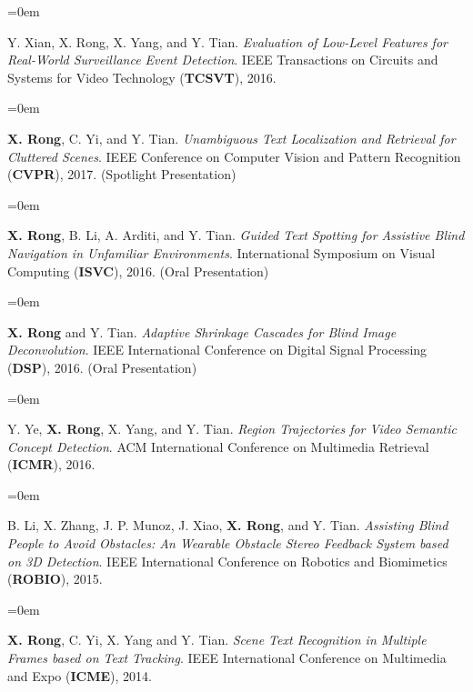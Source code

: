 \documentclass{scrartcl}
\newcommand{\Description}[1]{\hangindent=0em\hangafter=0\noindent\raggedright\footnotesize{#1}\par\normalsize\vspace{1em}} %
\begin{document}
\begin{cv}{}
\vspace{0.5em} %


\noindent{}\vspace{0.5em}

\Description{Y. Xian, X. Rong, X. Yang, and Y. Tian. \textit{Evaluation of Low-Level Features for Real-World Surveillance Event Detection}. IEEE Transactions on Circuits and Systems for Video Technology (\textbf{TCSVT}), 2016.}

\vspace{0.5em} %

\noindent{}\vspace{0.5em}

\Description{\textbf{X. Rong}, C. Yi, and Y. Tian. \textit{Unambiguous Text Localization and Retrieval for Cluttered Scenes}. IEEE Conference on Computer Vision and Pattern Recognition (\textbf{CVPR}), 2017. (Spotlight Presentation)}

\Description{\textbf{X. Rong}, B. Li, A. Arditi, and Y. Tian. \textit{Guided Text Spotting for Assistive Blind Navigation in Unfamiliar Environments}. International Symposium on Visual Computing (\textbf{ISVC}), 2016. (Oral Presentation)}

\Description{\textbf{X. Rong} and Y. Tian. \textit{Adaptive Shrinkage Cascades for Blind Image Deconvolution}. IEEE International Conference on Digital Signal Processing (\textbf{DSP}), 2016. (Oral Presentation)}

\Description{Y. Ye, \textbf{X. Rong}, X. Yang, and Y. Tian. \textit{Region Trajectories for Video Semantic Concept Detection}. ACM International Conference on Multimedia Retrieval (\textbf{ICMR}), 2016.}

\Description{B. Li, X. Zhang, J. P. Munoz, J. Xiao, \textbf{X. Rong}, and Y. Tian. \textit{Assisting Blind People to Avoid Obstacles: An Wearable Obstacle Stereo Feedback System based on 3D Detection}. IEEE International Conference on Robotics and Biomimetics (\textbf{ROBIO}), 2015.}

\Description{\textbf{X. Rong}, C. Yi, X. Yang and Y. Tian. \textit{Scene Text Recognition in Multiple Frames based on Text Tracking}. IEEE International Conference on Multimedia and Expo (\textbf{ICME}), 2014.}


\end{cv}
\end{document}
